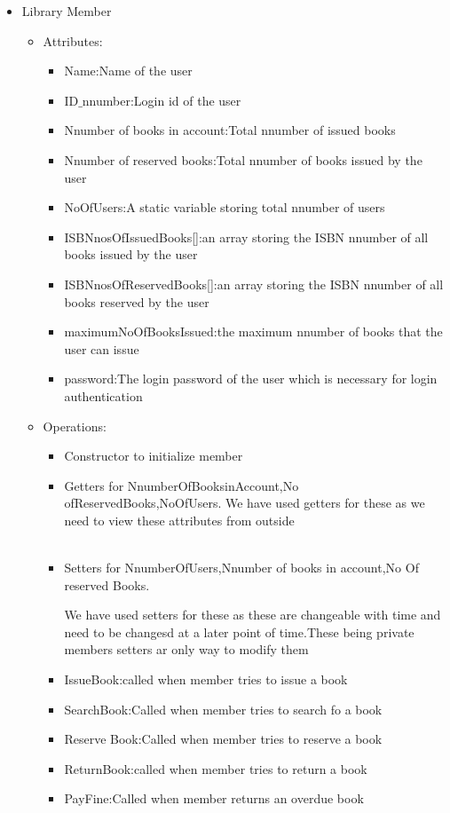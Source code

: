 \documentclass[a4paper]{article}
\begin{document}
\begin{itemize}
\item Library Member 
\begin{itemize}
\item Attributes:
\begin{itemize}
\item Name:Name of the user
\item ID$\_$nnumber:Login id of the user
\item Nnumber of books in account:Total nnumber of issued books
\item Nnumber of reserved books:Total nnumber of books issued by the user
\item NoOfUsers:A static variable storing total nnumber of users
\item ISBNnosOfIssuedBooks[]:an array storing the ISBN nnumber of all books issued by the user
\item ISBNnosOfReservedBooks[]:an array storing the ISBN nnumber of all books reserved by the user
\item maximumNoOfBooksIssued:the maximum nnumber of books that the user can issue
\item password:The login password of the user which is necessary for login authentication
\end{itemize}

\item Operations:
\begin{itemize}

\item Constructor to initialize member\\
\item Getters for NnumberOfBooksinAccount,No ofReservedBooks,NoOfUsers.
We have used getters for these as we need to view these attributes from outside \\\
\item Setters for NnumberOfUsers,Nnumber of books in account,No Of reserved Books.


We have used setters for these as these are changeable with time and need to be changesd at a later point of time.These being private members setters ar only way to modify them
\\
\item IssueBook:called when member tries to issue a book\\
\item SearchBook:Called when member tries to search fo a book\\
\item Reserve Book:Called when member tries to reserve a book\\
\item ReturnBook:called when member tries to return a book\\
\item PayFine:Called when member returns an overdue book\\


\end{itemize}
\end{itemize}
\end{itemize}
\end{document}
